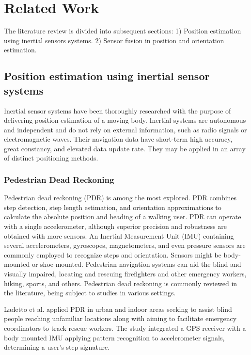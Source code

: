 \section{Related Work}
The literature review is divided into subsequent sections: 1) Position estimation using inertial sensors systems. 2) Sensor fusion in position and orientation estimation.

\subsection{Position estimation using inertial sensor systems}

Inertial sensor systems have been thoroughly researched with the purpose of delivering position estimation of a moving body. Inertial systems are autonomous and independent and do not rely on external information, such as radio signals or electromagnetic waves. Their navigation data have short-term high accuracy, great constancy, and elevated data update rate. They may be applied in an array of distinct positioning methods.

\subsubsection{Pedestrian Dead Reckoning}

Pedestrian dead reckoning (PDR) is among the most explored. PDR combines step detection, step length estimation, and orientation approximations to calculate the absolute position and heading of a walking user. PDR can operate with a single accelerometer, although superior precision and robustness are obtained with more sensors. An Inertial Measurement Unit (IMU) containing several accelerometers, gyroscopes, magnetometers, and even pressure sensors are commonly employed to recognize steps and orientation. Sensors might be body-mounted or shoe-mounted. Pedestrian navigation systems can aid the blind and visually impaired, locating and rescuing firefighters and other emergency workers, hiking, sports, and others. Pedestrian dead reckoning is commonly reviewed in the literature, being subject to studies in various settings.

Ladetto et al. \cite{ladetto2002step} applied PDR in urban and indoor areas seeking to assist blind people reaching unfamiliar locations along with aiming to facilitate emergency coordinators to track rescue workers. The study integrated a GPS receiver with a body mounted IMU applying pattern recognition to accelerometer signals, determining a user's step signature.

